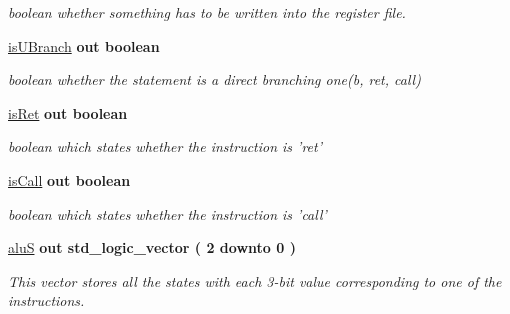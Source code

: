 \begin{DoxyCompactItemize}
\begin{DoxyCompactList}\small\item\em boolean whether something has to be written into the register file. \end{DoxyCompactList}\item 
\hypertarget{class_c_unit_ac34d5f9af81ab3e2e3aa51f7c1e267b3}{\hyperlink{class_c_unit_ac34d5f9af81ab3e2e3aa51f7c1e267b3}{is\-U\-Branch}  {\bfseries {\bfseries \textcolor{vhdlkeyword}{out}\textcolor{vhdlchar}{ }}} {\bfseries \textcolor{comment}{boolean}\textcolor{vhdlchar}{ }} }\label{class_c_unit_ac34d5f9af81ab3e2e3aa51f7c1e267b3}

\begin{DoxyCompactList}\small\item\em boolean whether the statement is a direct branching one(b, ret, call) \end{DoxyCompactList}\item 
\hypertarget{class_c_unit_acd79f46efcd273deffa5a712e1d155b3}{\hyperlink{class_c_unit_acd79f46efcd273deffa5a712e1d155b3}{is\-Ret}  {\bfseries {\bfseries \textcolor{vhdlkeyword}{out}\textcolor{vhdlchar}{ }}} {\bfseries \textcolor{comment}{boolean}\textcolor{vhdlchar}{ }} }\label{class_c_unit_acd79f46efcd273deffa5a712e1d155b3}

\begin{DoxyCompactList}\small\item\em boolean which states whether the instruction is 'ret' \end{DoxyCompactList}\item 
\hypertarget{class_c_unit_a455d189bc702a8327ce22986cbf13c49}{\hyperlink{class_c_unit_a455d189bc702a8327ce22986cbf13c49}{is\-Call}  {\bfseries {\bfseries \textcolor{vhdlkeyword}{out}\textcolor{vhdlchar}{ }}} {\bfseries \textcolor{comment}{boolean}\textcolor{vhdlchar}{ }} }\label{class_c_unit_a455d189bc702a8327ce22986cbf13c49}

\begin{DoxyCompactList}\small\item\em boolean which states whether the instruction is 'call' \end{DoxyCompactList}\item 
\hypertarget{class_c_unit_a871a1f390d61fb699f64ca9a3f332772}{\hyperlink{class_c_unit_a871a1f390d61fb699f64ca9a3f332772}{alu\-S}  {\bfseries {\bfseries \textcolor{vhdlkeyword}{out}\textcolor{vhdlchar}{ }}} {\bfseries \textcolor{comment}{std\-\_\-logic\-\_\-vector}\textcolor{vhdlchar}{ }\textcolor{vhdlchar}{(}\textcolor{vhdlchar}{ } \textcolor{vhdldigit}{2} \textcolor{vhdlchar}{ }\textcolor{vhdlchar}{ }\textcolor{vhdlchar}{ }\textcolor{vhdlkeyword}{downto}\textcolor{vhdlchar}{ }\textcolor{vhdlchar}{ }\textcolor{vhdlchar}{ } \textcolor{vhdldigit}{0} \textcolor{vhdlchar}{ }\textcolor{vhdlchar}{)}\textcolor{vhdlchar}{ }} }\label{class_c_unit_a871a1f390d61fb699f64ca9a3f332772}

\begin{DoxyCompactList}\small\item\em This vector stores all the states with each 3-\/bit value corresponding to one of the instructions. \end{DoxyCompactList}\end{DoxyCompactItemize}


